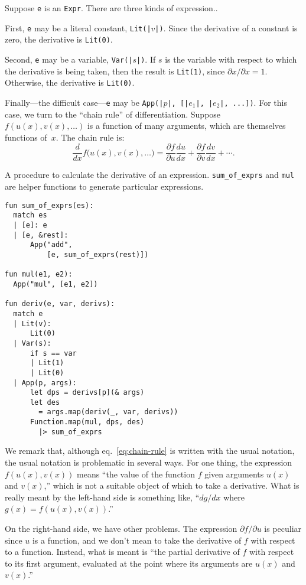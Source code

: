 \documentclass[11pt, a4paper]{article}
\newcommand{\cd}[1]{\texttt{#1}}
\begin{document}
Suppose \cd{e} is an \cd{Expr}. There are three kinds of expression..

First, \cd{e} may be a literal constant, \cd{Lit(|$v$|)}. Since the
derivative of a constant is zero, the derivative is \cd{Lit(0)}.

Second, \cd{e} may be a variable, \cd{Var(|$s$|)}. If $s$ is the
variable with respect to which the derivative is being taken, then the
result is \cd{Lit(1)}, since $\partial x/\partial x = 1$. Otherwise, the derivative
is \cd{Lit(0)}.

Finally---the difficult case---\cd{e} may be \cd{App(|$p$|, [|$e_1$|,
  |$e_2$|, ...])}. For this case, we turn to the ``chain rule'' of
differentiation. Suppose $f(u(x), v(x), \dots)$ is a function of many
arguments, which are themselves functions of~$x$. The chain rule is:
\begin{equation}\label{eq:chain-rule}
  \frac{d}{dx}f\bigl(u(x), v(x), \dotsc\bigr) =
  \frac{\partial f}{\partial u} \frac{du}{dx} 
  + \frac{\partial f}{\partial v}\frac{dv}{dx}
  + \dotsb. 
\end{equation}

\begin{marginfigure}
  \caption{A procedure to calculate the derivative of an
    expression. \cd{sum_of_exprs} and \cd{mul} are helper functions to
    generate particular expressions.\label{fig:deriv}}
  \footnotesize%
\begin{verbatim}
fun sum_of_exprs(es):
  match es
  | [e]: e
  | [e, &rest]:
      App("add",
          [e, sum_of_exprs(rest)])

fun mul(e1, e2):
  App("mul", [e1, e2])

fun deriv(e, var, derivs):
  match e
  | Lit(v):
      Lit(0)
  | Var(s):
      if s == var
      | Lit(1)
      | Lit(0)
  | App(p, args):
      let dps = derivs[p](& args)
      let des
        = args.map(deriv(_, var, derivs))
      Function.map(mul, dps, des)
        |> sum_of_exprs 
\end{verbatim}
\end{marginfigure}
We remark that, although eq.~\eqref{eq:chain-rule} is written with the
usual notation, the usual notation is problematic in several ways. For
one thing, the expression $f(u(x), v(x))$ means ``the value of the
function $f$ given arguments $u(x)$ and $v(x)$,'' which is not a
suitable object of which to take a derivative. What is really meant by
the left-hand side is something like, ``$dg/dx$ where
$g(x) = f(u(x),v(x))$.''

On the right-hand side, we have other problems. The expression
$\partial f/\partial u$ is peculiar since $u$ is a function, and we don't mean to
take the derivative of $f$ with respect to a function. Instead, what
is meant is ``the partial derivative of $f$ with respect to its first
argument, evaluated at the point where its arguments are $u(x)$
and~$v(x)$.''
\end{document}
